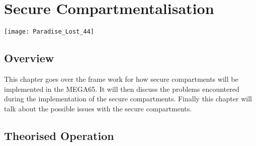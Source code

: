 
\chapter{Secure Compartmentalisation} %

\label{Chapter 6} %

\texttt{[image: Paradise\_Lost\_44]}


\section{Overview}

This chapter goes over the frame work for how secure compartments will be implemented in the MEGA65. It will then discuss the problems encountered during the implementation of the secure compartments. Finally this chapter will talk about the possible issues with the secure compartments.


\section{Theorised Operation}

\label{Ch6 Sec1}

